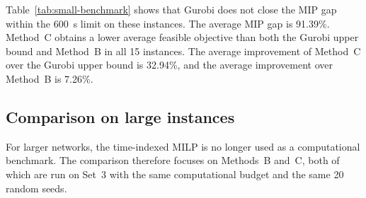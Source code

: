 Table~\ref{tab:small-benchmark} shows that Gurobi does not close the MIP gap
within the 600~s limit on these instances. The average MIP gap is 91.39\%.
Method~C obtains a lower average feasible objective than both the Gurobi upper
bound and Method~B in all 15 instances. The average improvement of Method~C over
the Gurobi upper bound is 32.94\%, and the average improvement over Method~B is
7.26\%.

\subsection{Comparison on large instances}\label{sec:exp-large-benchmark}

For larger networks, the time-indexed MILP is no longer used as a computational
benchmark. The comparison therefore focuses on Methods~B and~C, both of which
are run on Set~3 with the same computational budget and the same 20 random
seeds.

